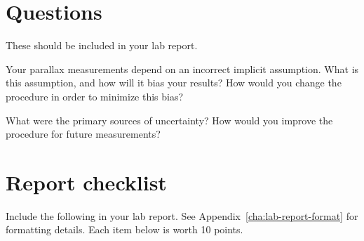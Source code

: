 
%

\section{Questions}\label{par:sec:questions}

These should be included in your lab report.

\begin{steps}
	\item Your parallax measurements depend on an incorrect implicit assumption. What is
	this assumption, and how will it bias your results? How would you change the
	procedure in order to minimize this bias?
	\item What were the primary sources
	of uncertainty? How would you improve the procedure for future measurements?
\end{steps}

\section{Report checklist}

Include the following in your lab report. See Appendix~\ref{cha:lab-report-format} for formatting details. Each item below is worth 10 points.

